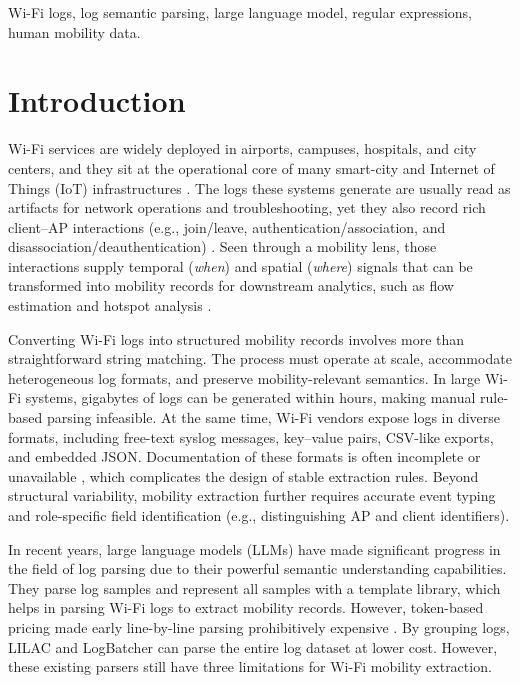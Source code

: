 \documentclass[journal]{IEEEtran}
\begin{document}
\begin{IEEEkeywords}
	Wi-Fi logs, log semantic parsing, large language model, regular expressions, human mobility data.
\end{IEEEkeywords}

\section{Introduction}
 Wi-Fi services are widely deployed in airports, campuses, hospitals, and city centers, and they sit at the operational core of many smart-city and Internet of Things (IoT) infrastructures \cite{ref1,ref2,ref3}. The logs these systems generate are usually read as artifacts for network operations and troubleshooting, yet they also record rich client--AP interactions (e.g., join/leave, authentication/association, and disassociation/deauthentication) \cite{zhu2025exploring, ref6}. Seen through a mobility lens, those interactions supply temporal (\emph{when}) and spatial (\emph{where}) signals that can be transformed into mobility records for downstream analytics, such as flow estimation and hotspot analysis \cite{ref4,ref5,ref9}.

Converting Wi-Fi logs into structured mobility records involves more than straightforward string matching. The process must operate at scale, accommodate heterogeneous log formats, and preserve mobility-relevant semantics. In large Wi-Fi systems, gigabytes of logs can be generated within hours, making manual rule-based parsing infeasible. At the same time, Wi-Fi vendors expose logs in diverse formats, including free-text syslog messages, key–value pairs, CSV-like exports, and embedded JSON. Documentation of these formats is often incomplete or unavailable \cite{ref14,ref15}, which complicates the design of stable extraction rules. Beyond structural variability, mobility extraction further requires accurate event typing and role-specific field identification (e.g., distinguishing AP and client identifiers).

In recent years, large language models (LLMs) have made significant progress in the field of log parsing due to their powerful semantic understanding capabilities. They parse log samples and represent all samples with a template library, which helps in parsing Wi-Fi logs to extract mobility records. However, token-based pricing made early line-by-line parsing prohibitively expensive \cite{ref43}. By grouping logs, LILAC \cite{ref30} and LogBatcher \cite{ref32} can parse the entire log dataset at lower cost. However, these existing parsers still have three limitations for Wi-Fi mobility extraction.
\end{document}
